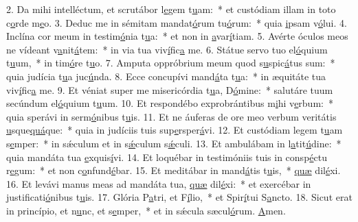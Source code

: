 2. Da mihi intelléctum, et scrutábor l\uline{e}gem t\uline{u}am:~* et custódiam illam in toto c\uline{o}rde m\uline{e}o.
3. Deduc me in sémitam mandat\uline{ó}rum tu\uline{ó}rum:~* quia \uline{i}psam v\uline{ó}lui.
4. Inclína cor meum in testim\uline{ó}nia t\uline{u}a:~* et non in \uline{a}var\uline{í}tiam.
5. Avérte óculos meos ne vídeant v\uline{a}nit\uline{á}tem:~* in via tua viv\uline{í}fic\uline{a} me.
6. Státue servo tuo el\uline{ó}quium t\uline{u}um,~* in tim\uline{ó}re t\uline{u}o.
7. Amputa oppróbrium meum quod s\uline{u}spic\uline{á}tus sum:~* quia judícia t\uline{u}a juc\uline{ú}nda.
8. Ecce concupívi mand\uline{á}ta t\uline{u}a:~* in æquitáte tua viv\uline{í}fic\uline{a} me.
9. Et véniat super me misericórdia t\uline{u}a, D\uline{ó}mine:~* salutáre tuum secúndum el\uline{ó}quium t\uline{u}um.
10. Et respondébo exprobrántibus m\uline{i}hi v\uline{e}rbum:~* quia sperávi in serm\uline{ó}nibus t\uline{u}is.
11. Et ne áuferas de ore meo verbum veritátis \uline{u}sque\uline{quá}que:~* quia in judíciis tuis sup\uline{e}rsper\uline{á}vi.
12. Et custódiam legem t\uline{u}am s\uline{e}mper:~* in sǽculum et in s\uline{ǽ}culum s\uline{ǽ}culi.
13. Et ambulábam in l\uline{a}tit\uline{ú}dine:~* quia mandáta tua \uline{e}xquis\uline{í}vi.
14. Et loquébar in testimóniis tuis in consp\uline{é}ctu r\uline{e}gum:~* et non c\uline{o}nfund\uline{é}bar.
15. Et meditábar in mand\uline{á}tis t\uline{u}is,~* \uline{quæ} dil\uline{é}xi.
16. Et levávi manus meas ad mandáta tua, \uline{quæ} dil\uline{é}xi:~* et exercébar in justificati\uline{ó}nibus t\uline{u}is.
17. Glória P\uline{a}tri, et F\uline{í}lio,~* et Spir\uline{í}tui S\uline{a}ncto.
18. Sicut erat in princípio, et n\uline{u}nc, et s\uline{e}mper,~* et in sǽcula sæcul\uline{ó}rum. \uline{A}men.

